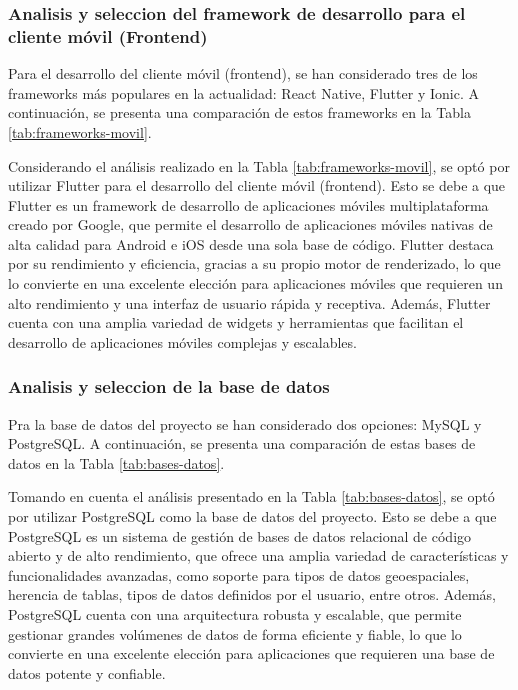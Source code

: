 \subsubsection{Analisis y seleccion del framework de desarrollo para el cliente móvil (Frontend)}

Para el desarrollo del cliente móvil (frontend), se han considerado tres de los frameworks más populares en la
actualidad: React Native, Flutter y Ionic. A continuación, se presenta una comparación de estos frameworks en la
Tabla \ref{tab:frameworks-movil}.



Considerando el análisis realizado en la Tabla \ref{tab:frameworks-movil}, se optó por utilizar Flutter para el
desarrollo del cliente móvil (frontend). Esto se debe a que Flutter es un framework de desarrollo de aplicaciones
móviles multiplataforma creado por Google, que permite el desarrollo de aplicaciones móviles nativas de alta
calidad para Android e iOS desde una sola base de código. Flutter destaca por su rendimiento y eficiencia, gracias
a su propio motor de renderizado, lo que lo convierte en una excelente elección para aplicaciones móviles que
requieren un alto rendimiento y una interfaz de usuario rápida y receptiva. Además, Flutter cuenta con una amplia
variedad de widgets y herramientas que facilitan el desarrollo de aplicaciones móviles complejas y escalables.

\subsubsection{Analisis y seleccion de la base de datos}

Pra la base de datos del proyecto se han considerado dos opciones: MySQL y PostgreSQL. A continuación, se presenta
una comparación de estas bases de datos en la Tabla \ref{tab:bases-datos}.



Tomando en cuenta el análisis presentado en la Tabla \ref{tab:bases-datos}, se optó por utilizar PostgreSQL como
la base de datos del proyecto. Esto se debe a que PostgreSQL es un sistema de gestión de bases de datos relacional
de código abierto y de alto rendimiento, que ofrece una amplia variedad de características y funcionalidades
avanzadas, como soporte para tipos de datos geoespaciales, herencia de tablas, tipos de datos definidos por el
usuario, entre otros. Además, PostgreSQL cuenta con una arquitectura robusta y escalable, que permite gestionar
grandes volúmenes de datos de forma eficiente y fiable, lo que lo convierte en una excelente elección para
aplicaciones que requieren una base de datos potente y confiable.
